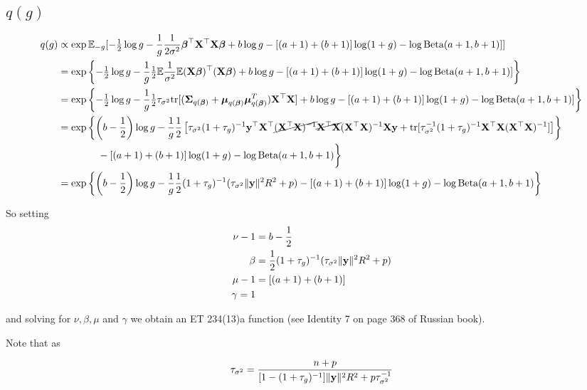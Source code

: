 \documentclass{amsart}[12pt]
\begin{document}
\subsection{$q(g)$}
\begin{align*}
q(g) &\propto \exp \mathbb{E}_{-g} [-\tfrac{1}{2} \log g - \frac{1}{g} \frac{1}{2 \sigma^2} {\boldsymbol \beta}^\top {\bf X}^\top {\bf X} {\boldsymbol\beta} + b \log g - [(a + 1) + (b + 1)] \log(1 + g) - \log \text{Beta} (a + 1, b + 1)]] \\
&= \exp \left \{ -\tfrac{1}{2} \log g - \frac{1}{g} \tfrac{1}{2} \mathbb{E} \frac{1}{\sigma^2} \mathbb{E} ({\bf X} {\boldsymbol \beta})^\top ({\bf X} {\boldsymbol \beta}) + b \log g - [(a + 1) + (b + 1)] \log(1 + g) - \log \text{Beta} (a + 1, b + 1)] \right \} \\
&= \exp \left \{ -\tfrac{1}{2} \log g - \frac{1}{g} \tfrac{1}{2} \tau_{\sigma^2} \text{tr}[({\boldsymbol \Sigma}_{q({\boldsymbol \beta})} + {\boldsymbol \mu}_{q({\boldsymbol \beta})} {\boldsymbol \mu}_{q({\boldsymbol \beta})}^T) {\bf X}^\top {\bf X}] + b \log g - [(a + 1) + (b + 1)] \log(1 + g) - \log \text{Beta} (a + 1, b + 1)] \right \} \\
&= \exp \left \{ \left(b - \frac{1}{2}\right) \log g - \frac{1}{g} \frac{1}{2} \left[\tau_{\sigma^2} (1 + \tau_g)^{-1} {\bf y}^\top {\bf X}^\top \cancel{({\bf X}^\top {\bf X})^{-1}} \cancel{{\bf X}^\top {\bf X}} ({\bf X}^\top {\bf X})^{-1} {\bf X} {\bf y} + \text{tr}{[\tau_{\sigma^2}^{-1} (1 + \tau_g)^{-1} {\bf X}^\top {\bf X}({\bf X}^\top {\bf X})^{-1}]} \right] \right \} \\
& \quad \quad \qquad	- [(a + 1) + (b + 1)] \log(1 + g) - \log \text{Beta} (a + 1, b + 1) \biggl \} \\
&= \exp \left \{ \left(b - \frac{1}{2}\right) \log g - \frac{1}{g} \frac{1}{2} (1 + \tau_g)^{-1} (\tau_{\sigma^2} \|{\bf y}\|^2 R^2 + p)
	- [(a + 1) + (b + 1)] \log(1 + g) - \log \text{Beta} (a + 1, b + 1) \right \}
\end{align*}

So setting
\begin{align*}
\nu - 1 &= b - \frac{1}{2} \\
\beta &= \frac{1}{2} (1 + \tau_g)^{-1} (\tau_{\sigma^2} \|{\bf y}\|^2 R^2 + p) \\
\mu - 1 &= [(a + 1) + (b + 1)] \\
\gamma = 1
\end{align*}

and solving for $\nu, \beta, \mu$ and $\gamma$ we obtain an ET 234(13)a function (see Identity 7 on page 368
of Russian book).

Note that as

\begin{align*}
\tau_{\sigma^2} = \frac{n + p}{[1 - (1 + \tau_g)^{-1}]\|{\bf y}\|^2 R^2 + p \tau_{\sigma^2}^{-1}}
\end{align*}
\end{document}
